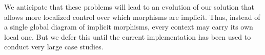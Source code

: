 We anticipate that these problems will lead to an evolution of our solution that allows more localized control over which morphisms are implicit.
Thus, instead of a single global diagram of implicit morphisms, every context may carry its own local one.
But we defer this until the current implementation has been used to conduct very large case studies.



